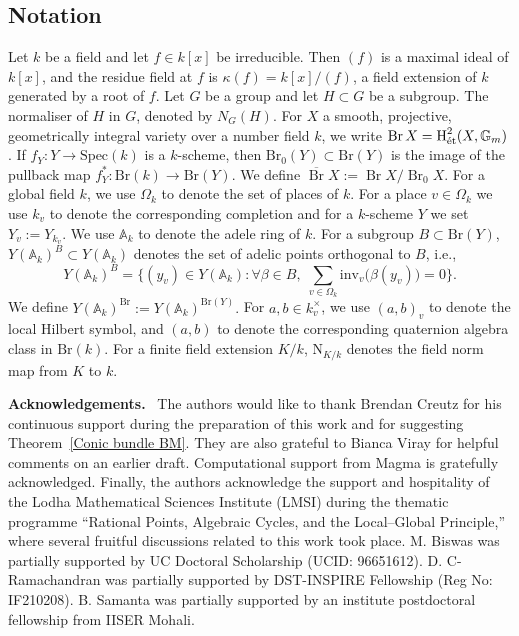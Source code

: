 \documentclass[10pt]{amsart}
\theoremstyle{plain}
\theoremstyle{definition}
\newenvironment{acknowledgements}
{\par\noindent\textbf{Acknowledgements.}\ }
{\par}
\newcommand{\Nm}{\mathrm{N}}
\newcommand{\Br}{\operatorname{Br}}
\begin{document}
 \subsection{Notation} Let $k$ be a field and let $f \in k[x]$ be irreducible. Then $(f)$ is a maximal ideal of $k[x]$, and the residue field at $f$ is
$\kappa(f) = k[x]/(f)$,
a field extension of $k$ generated by a root of $f$.
Let $G$ be a group and let $H \subset G$ be a subgroup. The normaliser of $H$ in $G$, denoted by $N_G(H)$.
    For $X$ a smooth, projective, geometrically integral variety over a number field $k$, we write $\Br X=\operatorname{H}^2_{\text{\rm \'et}}(X,\mathbb{G}_m)$. If $f_Y : Y \to \mathrm{Spec}(k)$ is a $k$-scheme, then $\mathrm{Br}_0(Y) \subset \mathrm{Br}(Y)$ is the image of the pullback map $f_Y^* : \mathrm{Br}(k) \to \mathrm{Br}(Y)$. We define $\overline{\Br}X:=\Br X/\Br_0X$.
    For a global field $k$, we use $\Omega_k$ to denote the set of places of $k$. For a place $v \in \Omega_k$ we use $k_v$ to denote the corresponding completion and for a $k$-scheme $Y$ we set $Y_v := Y_{k_v}$. We use $\mathbb{A}_k$ to denote the adele ring of $k$. For a subgroup $B \subset \mathrm{Br}(Y)$, $Y(\mathbb{A}_k)^B \subset Y(\mathbb{A}_k)$ denotes the set of adelic points orthogonal to $B$, i.e.,
\[
Y(\mathbb{A}_k)^B
=
\{(y_v) \in Y(\mathbb{A}_k) :
\forall \beta \in B,\;
\sum_{v \in \Omega_k} \mathrm{inv}_v\bigl(\beta(y_v)\bigr) = 0\}.
\]
We define $Y(\mathbb{A}_k)^{\mathrm{Br}} := Y(\mathbb{A}_k)^{\mathrm{Br}(Y)}.$ For $a,b \in k_v^\times$, we use $(a,b)_v$ to denote the local Hilbert symbol, and $(a,b)$ to denote the corresponding quaternion algebra class in $\mathrm{Br}(k)$. For a finite field extension $K/k$, $\Nm_{K/k}$ denotes the field norm map from $K$ to $k$.

\smallskip

\begin{acknowledgements}
The authors would like to thank Brendan Creutz for his continuous support during the preparation of this work and for suggesting Theorem~\ref{Conic bundle BM}. They are also grateful to Bianca Viray for helpful comments on an earlier draft. Computational support from Magma is gratefully acknowledged. Finally, the authors acknowledge the support and hospitality of the Lodha Mathematical Sciences Institute (LMSI) during the thematic programme “Rational Points, Algebraic Cycles, and the Local--Global Principle,” where several fruitful discussions related to this work took place. M. Biswas was partially supported by UC Doctoral Scholarship (UCID: 96651612). D. C-Ramachandran was partially supported by DST-INSPIRE Fellowship (Reg No: IF210208). B. Samanta was partially supported by an institute postdoctoral fellowship from IISER Mohali.
\end{acknowledgements}
\end{document}
